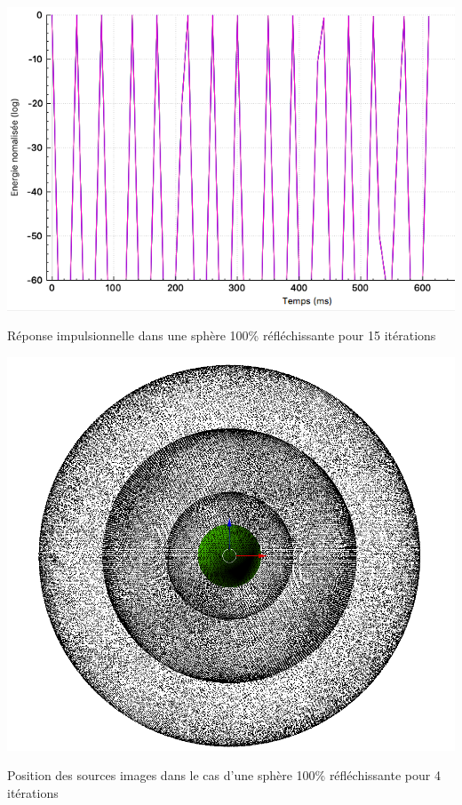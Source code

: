 \begin{figureth}
	\begin{subfigureth}{0.45\textwidth}
		\includegraphics[width=\linewidth]{images/test2RIR}
		\caption{Réponse impulsionnelle dans une sphère 100\% réfléchissante pour 15 itérations}
		\label{test2RIR}
	\end{subfigureth}
	\quad
	\begin{subfigureth}{0.45\textwidth}
		\includegraphics[width=\linewidth]{images/test2SI}
		\caption{Position des sources images dans le cas d'une sphère 100\% réfléchissante pour 4 itérations}
		\label{test2SI}
	\end{subfigureth}
\end{figureth}

